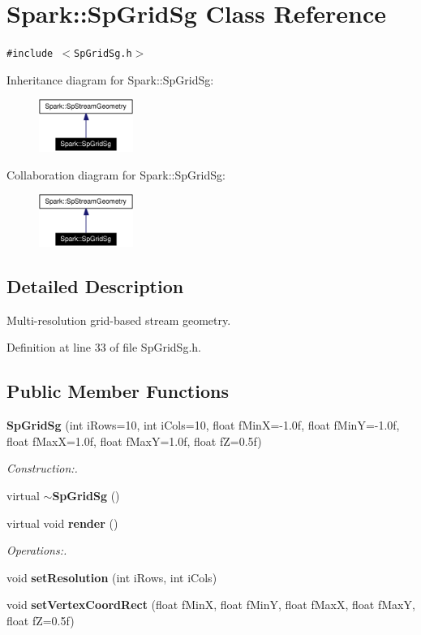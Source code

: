 \section{Spark::Sp\-Grid\-Sg Class Reference}
\label{classSpark_1_1SpGridSg}
{\tt \#include $<$Sp\-Grid\-Sg.h$>$}

Inheritance diagram for Spark::Sp\-Grid\-Sg:\begin{figure}[H]
\begin{center}
\leavevmode
\includegraphics[width=87pt]{classSpark_1_1SpGridSg__inherit__graph}
\end{center}
\end{figure}
Collaboration diagram for Spark::Sp\-Grid\-Sg:\begin{figure}[H]
\begin{center}
\leavevmode
\includegraphics[width=87pt]{classSpark_1_1SpGridSg__coll__graph}
\end{center}
\end{figure}


\subsection{Detailed Description}
Multi-resolution grid-based stream geometry. 

Definition at line 33 of file Sp\-Grid\-Sg.h.\subsection*{Public Member Functions}
\begin{CompactItemize}
\item 
{\bf Sp\-Grid\-Sg} (int i\-Rows=10, int i\-Cols=10, float f\-Min\-X=-1.0f, float f\-Min\-Y=-1.0f, float f\-Max\-X=1.0f, float f\-Max\-Y=1.0f, float f\-Z=0.5f)
\begin{CompactList}\small\item\em Construction:. \item\end{CompactList}\item 
virtual {\bf $\sim$Sp\-Grid\-Sg} ()
\item 
virtual void {\bf render} ()
\begin{CompactList}\small\item\em Operations:. \item\end{CompactList}\item 
void {\bf set\-Resolution} (int i\-Rows, int i\-Cols)
\item 
void {\bf set\-Vertex\-Coord\-Rect} (float f\-Min\-X, float f\-Min\-Y, float f\-Max\-X, float f\-Max\-Y, float f\-Z=0.5f)
\end{CompactItemize}
